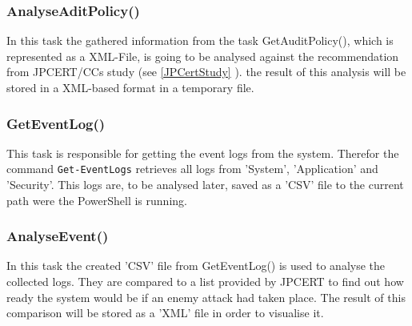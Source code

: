 \subsubsection{AnalyseAditPolicy()}
In this task the gathered information from the task GetAuditPolicy(), which is represented as a XML-File, is going to be analysed against the recommendation from JPCERT/CCs study (see \ref{JPCertStudy} ). the result of this analysis will be stored in a XML-based format in a temporary file.

\subsubsection{GetEventLog()}
This task is responsible for getting the event logs from the system. Therefor the command \lstinline|Get-EventLogs| \cite{Get-EventLogs} retrieves all logs from 'System', 'Application' and 'Security'. This logs are, to be analysed later, saved as a 'CSV' file to the current path were the PowerShell is running.

\subsubsection{AnalyseEvent()}
In this task the created 'CSV' file from GetEventLog() is used to analyse the collected logs. They are compared to a list provided by JPCERT to find out how ready the system would be if an enemy attack had taken place. The result of this comparison will be stored as a 'XML' file in order to visualise it.

